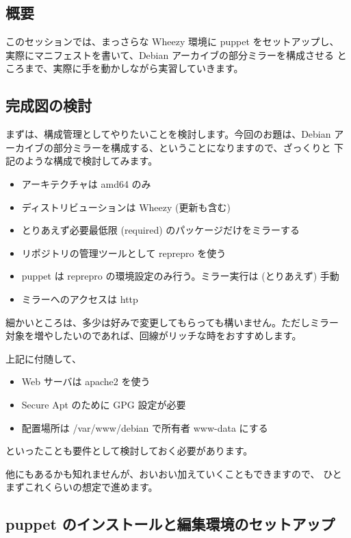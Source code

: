 \documentclass[mingoth,a4paper]{jsarticle}
\begin{document}

\subsection{概要}

このセッションでは、まっさらな Wheezy 環境に puppet をセットアップし、
実際にマニフェストを書いて、Debian アーカイブの部分ミラーを構成させる
ところまで、実際に手を動かしながら実習していきます。

\subsection{完成図の検討}

まずは、構成管理としてやりたいことを検討します。今回のお題は、Debian
アーカイブの部分ミラーを構成する、ということになりますので、ざっくりと
下記のような構成で検討してみます。

\begin{itemize}
\item
  アーキテクチャは amd64 のみ
\item
  ディストリビューションは Wheezy (更新も含む)
\item
  とりあえず必要最低限 (required) のパッケージだけをミラーする
\item
  リポジトリの管理ツールとして reprepro を使う
\item
  puppet は reprepro の環境設定のみ行う。ミラー実行は (とりあえず) 手動
\item
  ミラーへのアクセスは http
\end{itemize}

細かいところは、多少は好みで変更してもらっても構いません。ただしミラー
対象を増やしたいのであれば、回線がリッチな時をおすすめします。

上記に付随して、

\begin{itemize}
\item
  Web サーバは apache2 を使う
\item
  Secure Apt のために GPG 設定が必要
\item
  配置場所は /var/www/debian で所有者 www-data にする
\end{itemize}

といったことも要件として検討しておく必要があります。

他にもあるかも知れませんが、おいおい加えていくこともできますので、
ひとまずこれくらいの想定で進めます。

\subsection{puppet のインストールと編集環境のセットアップ}
\end{document}
